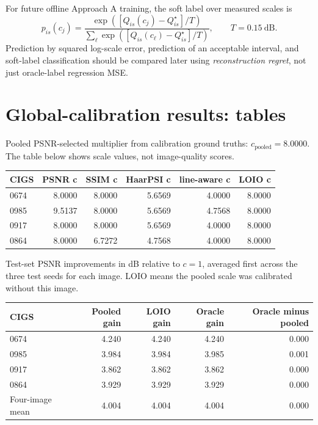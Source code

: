 \documentclass[11pt,a4paper]{article}
\begin{document}
For future offline Approach A training, the soft label over measured scales is\[p_{is}(c_j)=\frac{\exp([Q_{is}(c_j)-Q_{is}^\star]/T)}{\sum_{\ell}\exp([Q_{is}(c_\ell)-Q_{is}^\star]/T)},\qquad T=0.15\ \mathrm{dB}.\]Prediction by squared log-scale error, prediction of an acceptable interval, and soft-label classification should be compared later using \emph{reconstruction regret}, not just oracle-label regression MSE.

\section{Global-calibration results: tables}

Pooled PSNR-selected multiplier from calibration ground truths: $c_{\mathrm{pooled}}=8.0000$. The table below shows scale values, not image-quality scores.

\begin{center}
\small
\begin{tabular}{lrrrrr}
\toprule
CIGS & PSNR c & SSIM c & HaarPSI c & line-aware c & LOIO c\\
\midrule
0674 & 8.0000 & 8.0000 & 5.6569 & 4.0000 & 8.0000\\
0985 & 9.5137 & 8.0000 & 5.6569 & 4.7568 & 8.0000\\
0917 & 8.0000 & 8.0000 & 5.6569 & 4.0000 & 8.0000\\
0864 & 8.0000 & 6.7272 & 4.7568 & 4.0000 & 8.0000\\
\bottomrule
\end{tabular}
\end{center}

Test-set PSNR improvements in dB relative to $c=1$, averaged first across the three test seeds for each image. LOIO means the pooled scale was calibrated without this image.

\begin{center}
\small
\begin{tabular}{lrrrr}
\toprule
CIGS & Pooled gain & LOIO gain & Oracle gain & Oracle minus pooled\\
\midrule
0674 & 4.240 & 4.240 & 4.240 & 0.000\\
0985 & 3.984 & 3.984 & 3.985 & 0.001\\
0917 & 3.862 & 3.862 & 3.862 & 0.000\\
0864 & 3.929 & 3.929 & 3.929 & 0.000\\
Four-image mean & 4.004 & 4.004 & 4.004 & 0.000\\
\bottomrule
\end{tabular}
\end{center}
\end{document}
